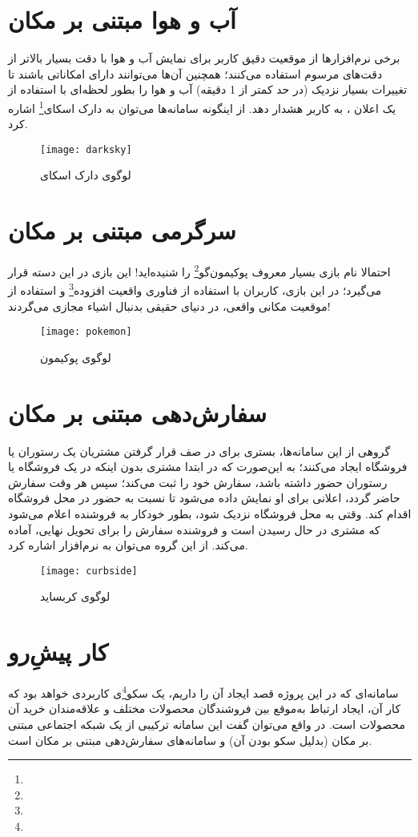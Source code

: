 \section{آب و هوا مبتنی بر مکان}

برخی نرم‌افزارها از موقعیت دقیق کاربر برای نمایش آب و هوا با دقت بسیار بالاتر از دقت‌های مرسوم استفاده می‌کنند؛ همچنین آن‌ها می‌توانند دارای امکاناتی باشند تا تغییرات بسیار نزدیک (در حد کمتر از 1 دقیقه) آب و هوا را بطور لحظه‌ای با استفاده از یک اعلان ، به کاربر هشدار دهد. از اینگونه سامانه‌ها می‌توان به دارک اسکای\footnote{}\cite{hist:4} اشاره کرد.

\begin{figure}[H]
	\centering
	\texttt{[image: darksky]}
	\caption{لوگوی دارک اسکای}
	\label{fig:darksky}
\end{figure}

\section{سرگرمی مبتنی بر مکان}

احتمالا نام بازی بسیار معروف پوکیمون‌گو\footnote{}\cite{hist:5} را شنیده‌اید! این بازی در این دسته قرار می‌گیرد؛ در این بازی، کاربران با استفاده از فناوری واقعیت افزوده\footnote{} و استفاده از موقعیت مکانی واقعی، در دنیای حقیقی بدنبال اشیاء مجازی می‌گردند!

\begin{figure}[b]
	\centering
	\texttt{[image: pokemon]}
	\caption{لوگوی پوکیمون}
	\label{fig:pokemon}
\end{figure}

\section{سفارش‌دهی مبتنی بر مکان}

گروهی از این سامانه‌ها، بستری برای در صف قرار گرفتن مشتریان یک رستوران یا فروشگاه ایجاد می‌کنند؛ به این‌صورت که در ابتدا مشتری بدون اینکه در یک فروشگاه یا رستوران حضور داشته باشد، سفارش خود را ثبت می‌کند؛ سپس هر وقت سفارش حاضر گردد، اعلانی برای او نمایش داده می‌شود تا نسبت به حضور در محل فروشگاه اقدام کند. وقتی به محل فروشگاه نزدیک شود، بطور خودکار به فروشنده اعلام می‌شود که مشتری در حال رسیدن است و فروشنده سفارش را برای تحویل نهایی، آماده می‌کند. از این گروه می‌توان به نرم‌افزار \cite{hist:6} اشاره کرد.

\begin{figure}[H]
	\centering
	\texttt{[image: curbside]}
	\caption{لوگوی کربساید}
	\label{fig:curbside}
\end{figure}


\section{کار پیشِ‌رو}

سامانه‌ای که در این پروژه قصد ایجاد آن را داریم، یک سکو\footnote{}ی کاربردی خواهد بود که کار آن، ایجاد ارتباط به‌موقع بین فروشندگان محصولات مختلف و علاقه‌مندان خرید آن محصولات است. در واقع می‌توان گفت این سامانه ترکیبی از یک شبکه اجتماعی مبتنی بر مکان (بدلیل سکو بودن آن) و سامانه‌های سفارش‌دهی مبتنی بر مکان است.
